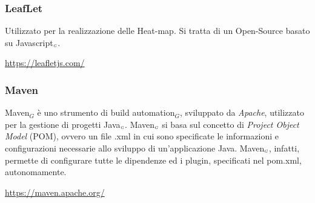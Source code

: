 \subsubsection{LeafLet}\label{ProcessiPrimariStrumentiLeafLet}
Utilizzato per la realizzazione delle Heat-map.
Si tratta di un Open-Source basato su Javascript$_{\scaleto{G}{3pt}}$.
\begin{center}
	\url{https://leafletjs.com/}
\end{center}
\subsubsection{Maven} \label{ProcessiPrimariStrumentiMaven}
	Maven$_G$ è uno strumento di build automation$_G$, sviluppato da \textit{Apache}, utilizzato per la gestione di progetti Java$_{\scaleto{G}{3pt}}$. Maven$_{\scaleto{G}{3pt}}$ si basa sul concetto di \textit{Project Object Model} (POM), ovvero un file .xml in cui sono specificate le informazioni e configurazioni necessarie allo sviluppo di un'applicazione Java. Maven$_{\scaleto{G}{3pt}}$, infatti, permette di configurare tutte le dipendenze ed i plugin, specificati nel pom.xml, autonomamente.
	\begin{center}
		\url{https://maven.apache.org/}
	\end{center}
